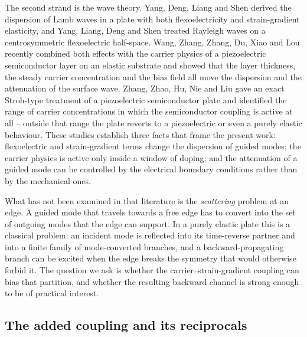 The second strand is the wave theory.  Yang, Deng, Liang and Shen
\cite{yang2018lamb} derived the dispersion of Lamb waves in a plate with both
flexoelectricity and strain-gradient elasticity, and Yang, Liang, Deng and Shen
\cite{yang2020rayleigh} treated Rayleigh waves on a centrosymmetric
flexoelectric half-space.  Wang, Zhang, Zhang, Du, Xiao and Lou
\cite{wang2025rayleigh} recently combined both effects with the carrier physics
of a piezoelectric semiconductor layer on an elastic substrate and showed that
the layer thickness, the steady carrier concentration and the bias field all
move the dispersion and the attenuation of the surface wave.  Zhang, Zhao, Hu,
Nie and Liu \cite{zhang2025pscplate} gave an exact Stroh-type treatment of a
piezoelectric semiconductor plate and identified the range of carrier
concentrations in which the semiconductor coupling is active at all -- outside
that range the plate reverts to a piezoelectric or even a purely elastic
behaviour.  These studies establish three facts that frame the present work:
flexoelectric and strain-gradient terms change the dispersion of guided modes;
the carrier physics is active only inside a window of doping; and the
attenuation of a guided mode can be controlled by the electrical boundary
conditions rather than by the mechanical ones.

What has not been examined in that literature is the \emph{scattering} problem
at an edge.  A guided mode that travels towards a free edge has to convert into
the set of outgoing modes that the edge can support.  In a purely elastic plate
this is a classical problem: an incident mode is reflected into its time-reverse
partner and into a finite family of mode-converted branches, and a
backward-propagating branch can be excited when the edge breaks the symmetry
that would otherwise forbid it.  The question we ask is whether the
carrier--strain-gradient coupling can bias that partition, and whether the
resulting backward channel is strong enough to be of practical interest.

\subsection{The added coupling and its reciprocals}
\label{sec:intro_coupling}

